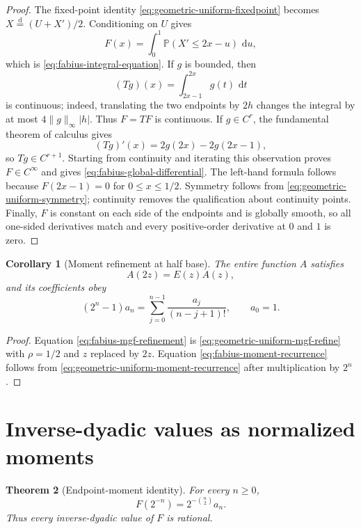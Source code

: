 \documentclass[11pt,oneside,openany]{book}
\newtheorem{theorem}{Theorem}[chapter]
\newtheorem{corollary}[theorem]{Corollary}
\theoremstyle{definition}
\theoremstyle{remark}
\newcommand{\dd}{\,\mathrm d}
\newcommand{\Prob}{\mathbb P}
\begin{document}
\begin{proof}
The fixed-point identity \eqref{eq:geometric-uniform-fixedpoint} becomes $X\overset{\mathrm d}{=}(U+X')/2$.  Conditioning on $U$ gives
\[
 F(x)=\int_0^1\Prob(X'\le2x-u)\,\dd u,
\]
which is \eqref{eq:fabius-integral-equation}.  If $g$ is bounded, then
\[
 (Tg)(x)=\int_{2x-1}^{2x}g(t)\,\dd t
\]
is continuous; indeed, translating the two endpoints by $2h$ changes the integral by at most $4\|g\|_\infty|h|$.  Thus $F=TF$ is continuous.  If $g\in C^r$, the fundamental theorem of calculus gives
\[
 (Tg)'(x)=2g(2x)-2g(2x-1),
\]
so $Tg\in C^{r+1}$.  Starting from continuity and iterating this observation proves $F\in C^\infty$ and gives \eqref{eq:fabius-global-differential}.  The left-hand formula follows because $F(2x-1)=0$ for $0\le x\le1/2$.  Symmetry follows from \eqref{eq:geometric-uniform-symmetry}; continuity removes the qualification about continuity points.  Finally, $F$ is constant on each side of the endpoints and is globally smooth, so all one-sided derivatives match and every positive-order derivative at $0$ and $1$ is zero.
\end{proof}

\begin{corollary}[Moment refinement at half base]\label{cor:fabius-moment-refinement}
The entire function $A$ satisfies
\begin{equation}
 A(2z)=E(z)A(z),\label{eq:fabius-mgf-refinement}
\end{equation}
and its coefficients obey
\begin{equation}
 (2^n-1)a_n=\sum_{j=0}^{n-1}\frac{a_j}{(n-j+1)!},
 \qquad a_0=1.\label{eq:fabius-moment-recurrence}
\end{equation}
\end{corollary}

\begin{proof}
Equation \eqref{eq:fabius-mgf-refinement} is \eqref{eq:geometric-uniform-mgf-refine} with $\rho=1/2$ and $z$ replaced by $2z$.  Equation \eqref{eq:fabius-moment-recurrence} follows from \eqref{eq:geometric-uniform-moment-recurrence} after multiplication by $2^n$.
\end{proof}

\section{Inverse-dyadic values as normalized moments}

\begin{theorem}[Endpoint-moment identity]\label{thm:fabius-endpoint-moment}
For every $n\ge0$,
\begin{equation}
 F(2^{-n})=2^{-\binom n2}a_n.\label{eq:fabius-endpoint-moment}
\end{equation}
Thus every inverse-dyadic value of $F$ is rational.
\end{theorem}
\end{document}
